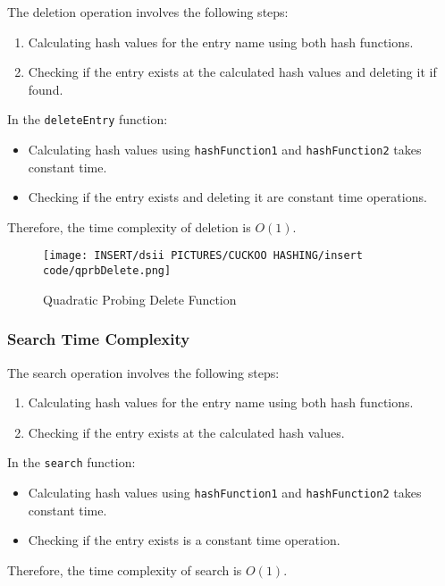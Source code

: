 \documentclass[12pt]{article}
\begin{document}
The deletion operation involves the following steps:
\begin{enumerate}
    \item Calculating hash values for the entry name using both hash functions.
    \item Checking if the entry exists at the calculated hash values and deleting it if found.
\end{enumerate}

In the \texttt{deleteEntry} function:
\begin{itemize}
    \item Calculating hash values using \texttt{hashFunction1} and \texttt{hashFunction2} takes constant time.
    \item Checking if the entry exists and deleting it are constant time operations.
\end{itemize}

Therefore, the time complexity of deletion is $O(1)$.

\begin{figure}[htbp]
    \centering
    \texttt{[image: INSERT/dsii PICTURES/CUCKOO HASHING/insert code/qprbDelete.png]}
    \caption{Quadratic Probing Delete Function}
    \label{fig:quadratic_deletion}
\end{figure}

\newpage

\subsubsection{Search Time Complexity}

The search operation involves the following steps:
\begin{enumerate}
    \item Calculating hash values for the entry name using both hash functions.
    \item Checking if the entry exists at the calculated hash values.
\end{enumerate}

In the \texttt{search} function:
\begin{itemize}
    \item Calculating hash values using \texttt{hashFunction1} and \texttt{hashFunction2} takes constant time.
    \item Checking if the entry exists is a constant time operation.
\end{itemize}

Therefore, the time complexity of search is $O(1)$.
\end{document}

